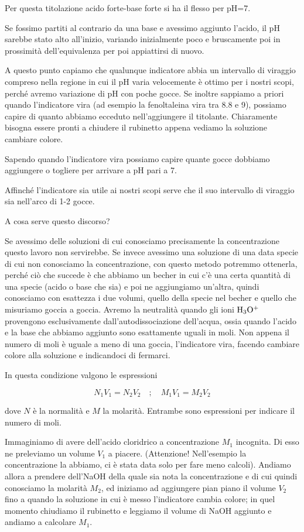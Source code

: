 Per questa titolazione acido forte-base forte si ha il flesso per pH=7.

Se fossimo partiti al contrario da una base e avessimo aggiunto l'acido, il pH sarebbe stato alto all'inizio, variando inizialmente poco e bruscamente poi in prossimità dell'equivalenza per poi appiattirsi di nuovo.

A questo punto capiamo che qualunque indicatore abbia un intervallo di viraggio compreso nella regione in cui il pH varia velocemente è ottimo per i nostri scopi, perché avremo variazione di pH con poche gocce. Se inoltre sappiamo a priori quando l'indicatore vira (ad esempio la fenoltaleina vira tra 8.8 e 9), possiamo capire di quanto abbiamo ecceduto nell'aggiungere il titolante. Chiaramente bisogna essere pronti a chiudere il rubinetto appena vediamo la soluzione cambiare colore.

Sapendo quando l'indicatore vira possiamo capire quante gocce dobbiamo aggiungere o togliere per arrivare a pH pari a 7.

Affinché l'indicatore sia utile ai nostri scopi serve che il suo intervallo di viraggio sia nell'arco di 1-2 gocce.

A cosa serve questo discorso?

Se avessimo delle soluzioni di cui conosciamo precisamente la concentrazione questo lavoro non servirebbe. Se invece avessimo una soluzione di una data specie di cui non conosciamo la concentrazione, con questo metodo potremmo ottenerla, perché ciò che succede è che abbiamo un becher in cui c'è una certa quantità di una specie (acido o base che sia) e poi ne aggiungiamo un'altra, quindi conosciamo con esattezza i due volumi, quello della specie nel becher e quello che misuriamo goccia a goccia. Avremo la neutralità quando gli ioni $\rm H_3O^+$ provengono esclusivamente dall'autodissociazione dell'acqua, ossia quando l'acido e la base che abbiamo aggiunto sono esattamente uguali in moli. Non appena il numero di moli è uguale a meno di una goccia, l'indicatore vira, facendo cambiare colore alla soluzione e indicandoci di fermarci.

In questa condizione valgono le espressioni

$$N_1V_1=N_2V_2
\quad
;
\quad
M_1V_1=M_2V_2$$

dove $N$ è la normalità e $M$ la molarità. Entrambe sono espressioni per indicare il numero di moli.

Immaginiamo di avere dell'acido cloridrico a concentrazione $M_1$ incognita. Di esso ne preleviamo un volume $V_1$ a piacere. (Attenzione! Nell'esempio la concentrazione la abbiamo, ci è stata data solo per fare meno calcoli). Andiamo allora a prendere dell'NaOH della quale sia nota la concentrazione e di cui quindi conosciamo la molarità $M_2$, ed iniziamo ad aggiungere pian piano il volume $V_2$ fino a quando la soluzione in cui è messo l'indicatore cambia colore; in quel momento chiudiamo il rubinetto e leggiamo il volume di NaOH aggiunto e andiamo a calcolare $M_1$.

